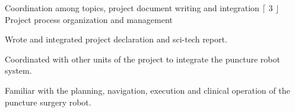\begin{cventries}
\cventry
{Coordination among topics, project document writing and integration} %
{$\lceil$ 3 $\rfloor$ Project process organization and management} %
{} %
{} %
{
  \begin{cvitems} %
    \item Wrote and integrated project declaration and sci-tech report.
    \item Coordinated with other units of the project to integrate the puncture robot system.
    \item Familiar with the planning, navigation, execution and clinical operation of the puncture surgery robot.
  \end{cvitems}
}
\end{cventries}
